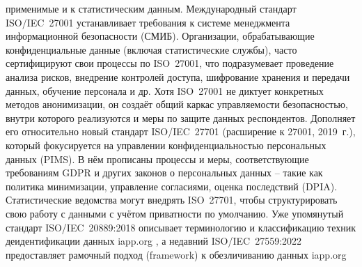 применимые и к статистическим данным. Международный стандарт ISO/IEC 27001 устанавливает требования к системе менеджмента информационной безопасности (СМИБ). Организации, обрабатывающие конфиденциальные данные (включая статистические службы), часто сертифицируют свои процессы по ISO 27001, что подразумевает проведение анализа рисков, внедрение контролей доступа, шифрование хранения и передачи данных, обучение персонала и др. Хотя ISO 27001 не диктует конкретных методов анонимизации, он создаёт общий каркас управляемости безопасностью, внутри которого реализуются и меры по защите данных респондентов. Дополняет его относительно новый стандарт ISO/IEC 27701 (расширение к 27001, 2019 г.), который фокусируется на управлении конфиденциальностью персональных данных (PIMS). В нём прописаны процессы и меры, соответствующие требованиям GDPR и других законов о персональных данных – такие как политика минимизации, управление согласиями, оценка последствий (DPIA). Статистические ведомства могут внедрять ISO 27701, чтобы структурировать свою работу с данными с учётом приватности по умолчанию. Уже упомянутый стандарт ISO/IEC 20889:2018 описывает терминологию и классификацию техник деидентификации данных
iapp.org
, а недавний ISO/IEC 27559:2022 предоставляет рамочный подход (framework) к обезличиванию данных
iapp.org
